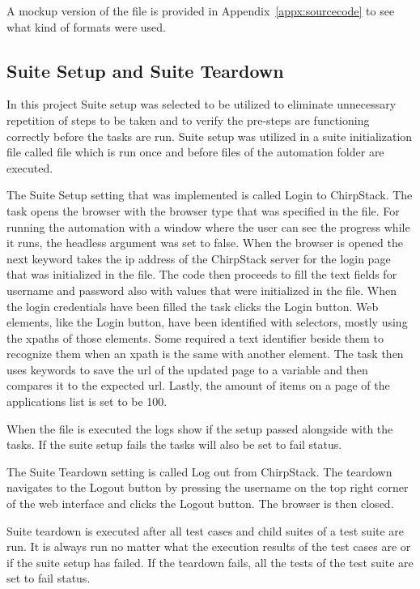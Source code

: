 A mockup version of the file is provided in Appendix~\ref{appx:sourcecode} to see what kind of formats were used.

\subsection{Suite Setup and Suite Teardown}

In this project Suite setup was selected to be utilized to eliminate unnecessary repetition of steps to be taken and to verify the pre-steps are functioning correctly before the tasks are run.
Suite setup was utilized in a suite initialization file called  file which is run once and before files of the automation folder are executed.

The Suite Setup setting that was implemented is called Login to ChirpStack.
The task opens the browser with the browser type that was specified in the  file.
For running the automation with a window where the user can see the progress while it runs, the headless argument was set to false.
When the browser is opened the next keyword takes the \gls{ip} address of the ChirpStack server for the login page that was initialized in the  file.
The code then proceeds to fill the text fields for username and password also with values that were initialized in the  file.
When the login credentials have been filled the task clicks the Login button.
Web elements, like the Login button, have been identified with selectors, mostly using the xpaths of those elements.
Some required a text identifier beside them to recognize them when an xpath is the same with another element.
The task then uses keywords to save the \gls{url} of the updated page to a variable and then compares it to the expected \gls{url}.
Lastly, the amount of items on a page of the applications list is set to be 100.

When the  file is executed the logs show if the setup passed alongside with the tasks.
If the suite setup fails the tasks will also be set to fail status\cite{robotFrameworkUserGuide:suiteSetupAndTeardown}.

The Suite Teardown setting is called Log out from ChirpStack.
The teardown navigates to the Logout button by pressing the username on the top right corner of the web interface and clicks the  Logout button.
The browser is then closed.

Suite teardown is executed after all test cases and child suites of a test suite are run.
It is always run no matter what the execution results of the test cases are or if the suite setup has failed.
If the teardown fails, all the tests of the test suite are set to fail status\cite{robotFrameworkUserGuide:suiteSetupAndTeardown}.

